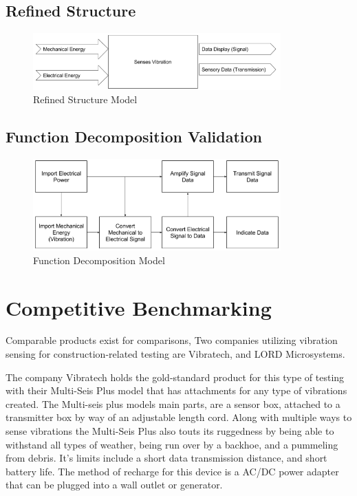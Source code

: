 \documentclass[12pt]{article}
\begin{document}
\subsection{Refined Structure}
\begin{figure}[h!]
	\centering
	\includegraphics[width=0.85\textwidth]{refinedstructuremodel.png}
	\caption{Refined Structure Model}
	\label{fig:Refined Structure}
\end{figure}
\subsection{Function Decomposition Validation}
\begin{figure}[h!]
	\centering
	\includegraphics[width=0.85\textwidth]{decompmodel.png}
	\caption{Function Decomposition Model}
	\label{fig:Decomposition Model}
\end{figure}





\section{Competitive Benchmarking}

Comparable products exist for comparisons, Two companies utilizing vibration sensing for construction-related testing are Vibratech, and LORD Microsystems.  

The company Vibratech holds the gold-standard product for this type of testing with their Multi-Seis Plus model that has attachments for any type of vibrations created.  The Multi-seis plus models main parts, are a sensor box, attached to a transmitter box by way of an adjustable length cord.  Along with multiple ways to sense vibrations the Multi-Seis Plus also touts its ruggedness by being able to withstand all types of weather, being run over by a backhoe, and a pummeling from debris. It's limits include a short data transmission distance, and short battery life. The method of recharge for this device is a AC/DC power adapter that can be plugged into a wall outlet or generator.  
\end{document}
